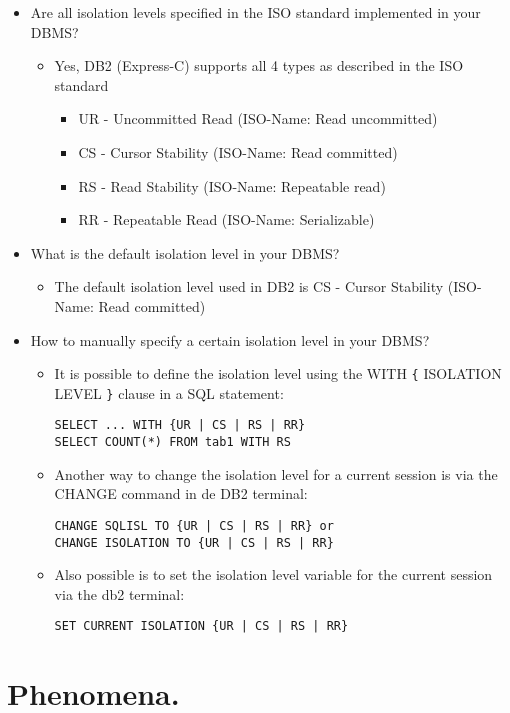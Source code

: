 \documentclass{vldb}
\begin{document}
\begin{itemize}
\item Are all isolation levels specified in the ISO standard implemented in your DBMS?
\begin{itemize}
\item Yes, DB2 (Express-C) supports all 4 types as described in the ISO standard
\begin{itemize}
\item UR - Uncommitted Read (ISO-Name: Read uncommitted)
\item CS - Cursor Stability (ISO-Name: Read committed)
\item RS - Read Stability (ISO-Name: Repeatable read)
\item RR - Repeatable Read (ISO-Name: Serializable)
\end{itemize}
\end{itemize}
\item What is the default isolation level in your DBMS?
\begin{itemize}
\item The default isolation level used in DB2 is CS - Cursor Stability (ISO-Name: Read committed)
\end{itemize}
\item How to manually specify a certain isolation level in your DBMS?
\begin{itemize}
\item It is possible to define the isolation level using the WITH \verb|{| ISOLATION LEVEL \verb|}| clause in a SQL statement: 
\begin{verbatim}
SELECT ... WITH {UR | CS | RS | RR}
SELECT COUNT(*) FROM tab1 WITH RS
\end{verbatim}
\item Another way to change the isolation level for a current session is via the CHANGE command in de DB2 terminal:
\begin{verbatim}
CHANGE SQLISL TO {UR | CS | RS | RR} or
CHANGE ISOLATION TO {UR | CS | RS | RR}
\end{verbatim}
\item Also possible is to set the isolation level variable for the current session via the db2 terminal:
\begin{verbatim}
SET CURRENT ISOLATION {UR | CS | RS | RR}
\end{verbatim}

\end{itemize}
\end{itemize}

\section{Phenomena.}
\end{document}
